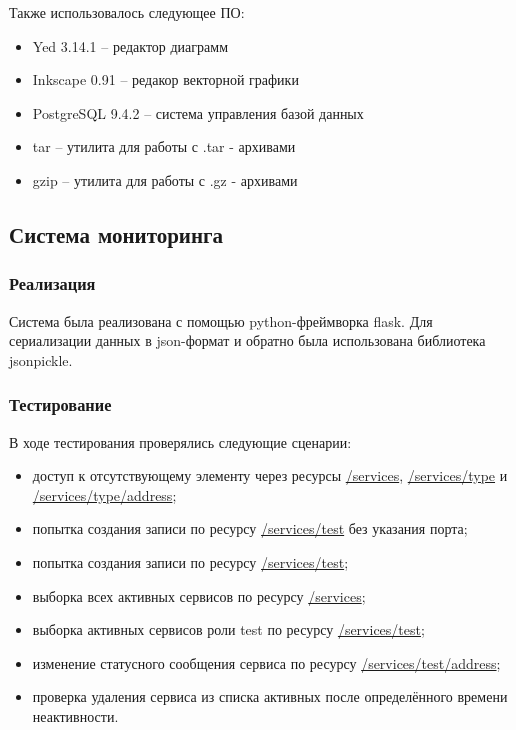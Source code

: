 \documentclass[a4paper,12pt]{report}
\numberwithin{equation}{section}
\begin{document}
  Также использовалось следующее ПО:
  \begin{itemize}
    \item Yed 3.14.1 \cite{yed} -- редактор диаграмм
    \item Inkscape 0.91 \cite{inkscape} -- редакор векторной графики
    \item PostgreSQL 9.4.2 \cite{postgresql} -- система управления базой данных
    \item tar \cite{tarl, tarw} -- утилита для работы с .tar - архивами
    \item gzip \cite{gzipl, gzipw} -- утилита для работы с .gz - архивами
  \end{itemize}
  
  \subsection{Система мониторинга}
  \subsubsection{Реализация}
  Система была реализована с помощью python-фреймворка flask.
  Для сериализации данных в json-формат и обратно была использована библиотека jsonpickle.
  
  \subsubsection{Тестирование}
  В ходе тестирования проверялись следующие сценарии:
  
  \begin{itemize}
    \item доступ к отсутствующему элементу через ресурсы \url{/services}, \url{/services/type} и \url{/services/type/address};
    \item попытка создания записи по ресурсу \url{/services/test} без указания порта;
    \item попытка создания записи по ресурсу \url{/services/test};
    \item выборка всех активных сервисов по ресурсу \url{/services};
    \item выборка активных сервисов роли test по ресурсу \url{/services/test};
    \item изменение статусного сообщения сервиса по ресурсу \url{/services/test/address};
    \item проверка удаления сервиса из списка активных после определённого времени неактивности.
  \end{itemize}
  
\end{document}
